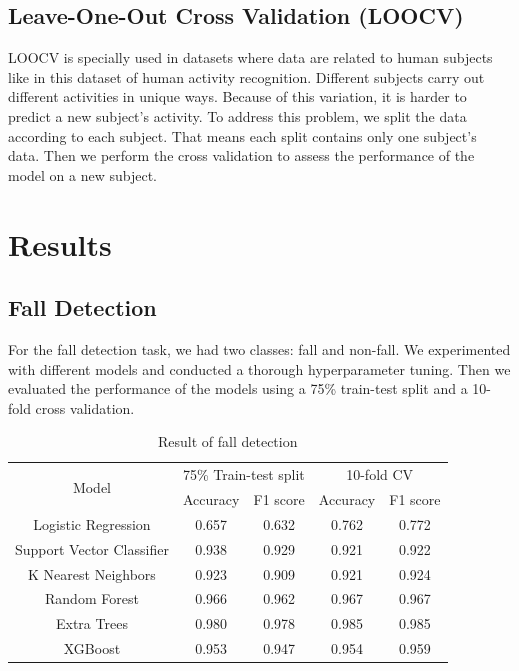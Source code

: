 \subsection{Leave-One-Out Cross Validation (LOOCV)}
LOOCV is specially used in datasets where data are related to human subjects like in this dataset of human activity recognition. Different subjects carry out different activities in unique ways. Because of this variation, it is harder to predict a new subject's activity. To address this problem, we split the data according to each subject. That means each split contains only one subject's data. Then we perform the cross validation to assess the performance of the model on a new subject.

\section{Results}

\subsection{Fall Detection}
For the fall detection task, we had two classes: fall and non-fall. We experimented with different models and conducted a thorough hyperparameter tuning. Then we evaluated the performance of the models using a 75\% train-test split and a 10-fold cross validation. 
\begin{table}[H]
\caption{Result of fall detection}
\vspace{2mm}
\centering
\begin{tabular}{|c|cc|cc|}
\hline
\multirow{2}{*}{Model}    & \multicolumn{2}{c|}{75\% Train-test split}     & \multicolumn{2}{c|}{10-fold CV}          \\ \cline{2-5} 
                          & \multicolumn{1}{c|}{Accuracy} & F1 score & \multicolumn{1}{c|}{Accuracy} & F1 score \\ \hline
Logistic Regression       & \multicolumn{1}{c|}{0.657}    & 0.632    & \multicolumn{1}{c|}{0.762}    & 0.772    \\
Support Vector Classifier & \multicolumn{1}{c|}{0.938}    & 0.929    & \multicolumn{1}{c|}{0.921}    & 0.922    \\
K Nearest Neighbors       & \multicolumn{1}{c|}{0.923}    & 0.909    & \multicolumn{1}{c|}{0.921}    & 0.924    \\
Random Forest             & \multicolumn{1}{c|}{0.966}    & 0.962    & \multicolumn{1}{c|}{0.967}    & 0.967    \\
Extra Trees               & \multicolumn{1}{c|}{0.980}    & 0.978    & \multicolumn{1}{c|}{0.985}    & 0.985    \\
XGBoost                   & \multicolumn{1}{c|}{0.953}    & 0.947    & \multicolumn{1}{c|}{0.954}    & 0.959    \\ \hline
\end{tabular}
\label{Table 5.1}
\end{table}


